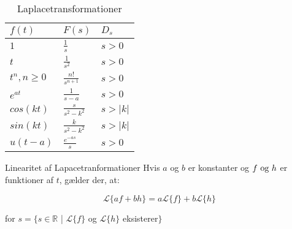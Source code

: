 \begin{table}[htbp]
\centering
\caption{Laplacetransformationer}
\label{TableOne}
\begin{tabular}{|l|l|l|}
\hline
$f(t)$          & $F(s)$               & $D_s$     \\ \hline
$1$             & $\frac{1}{s}$        & $s > 0$   \\ \hline
$t$             & $\frac{1}{s^2}$      & $s > 0$   \\ \hline
$t^n, n \geq 0$ & $\frac{n!}{s^{n+1}}$ & $s > 0$   \\ \hline
$e^{at}$        & $\frac{1}{s-a}$      & $s > 0$   \\ \hline
$cos(kt)$       & $\frac{s}{s^2-k^2}$  & $s > |k|$ \\ \hline
$sin(kt)$       & $\frac{k}{s^2-k^2}$  & $s > |k|$ \\ \hline
$u(t-a)$        & $\frac{e^{-as}}{s}$  & $s > 0$   \\ \hline
\end{tabular}
\end{table}



\hfill \break

\begin{mytheo}{Linearitet af Lapacetranformationer}{}
Hvis $a$ og $b$ er konstanter og $f \ \textnormal{og} \ h$ er funktioner af $t$, gælder der, at:

$$\mathcal{L}\{af + bh\} = a\mathcal{L}\{f\} + b\mathcal{L}\{h\}$$

for $s = \{ s \in \mathbb{R}$ | $\mathcal{L}\{f\}$ og $\mathcal{L}\{h\}$ eksisterer$\}$
\end{mytheo}

